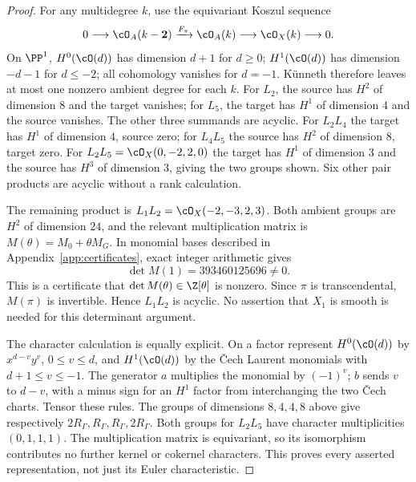 \begin{proof}
For any multidegree $k$, use the equivariant Koszul sequence
\[
 0\longrightarrow\cO_A(k-\mathbf2)
 \xrightarrow{F_\pi}\cO_A(k)\longrightarrow\cO_X(k)\longrightarrow0.
\]
On $\PP^1$, $H^0(\cO(d))$ has dimension $d+1$ for $d\ge0$;
$H^1(\cO(d))$ has dimension $-d-1$ for $d\le-2$; all cohomology
vanishes for $d=-1$. K\"unneth therefore leaves at most one nonzero
ambient degree for each $k$.
For $L_2$, the source has $H^2$ of dimension $8$ and the target
vanishes; for $L_5$, the target has $H^1$ of dimension $4$ and the
source vanishes. The other three summands are acyclic.
For $L_2L_4$ the target has $H^1$ of dimension $4$, source zero;
for $L_4L_5$ the source has $H^2$ of dimension $8$, target zero.
For $L_2L_5=\cO_X(0,-2,2,0)$ the target has $H^1$ of dimension $3$
and the source has $H^3$ of dimension $3$, giving the two groups shown.
Six other pair products are acyclic without a rank calculation.

The remaining product is $L_1L_2=\cO_X(-2,-3,2,3)$. Both ambient
groups are $H^2$ of dimension $24$, and the relevant multiplication
matrix is $M(\theta)=M_0+\theta M_G$. In monomial bases described in
Appendix~\ref{app:certificates}, exact integer arithmetic gives
\begin{equation}\label{eq:detcertificate}
 \det M(1)=393460125696\ne0.
\end{equation}
This is a certificate that $\det M(\theta)\in\Z[\theta]$ is nonzero.
Since $\pi$ is transcendental, $M(\pi)$ is invertible. Hence $L_1L_2$
is acyclic. No assertion that $X_1$ is smooth is needed for this
determinant argument.

The character calculation is equally explicit. On a factor represent
$H^0(\cO(d))$ by $x^{d-v}y^v$, $0\le v\le d$, and
$H^1(\cO(d))$ by the \v Cech Laurent monomials with
$d+1\le v\le-1$. The generator $a$ multiplies the monomial by $(-1)^v$;
$b$ sends $v$ to $d-v$, with a minus sign for an $H^1$ factor from
interchanging the two \v Cech charts. Tensor these rules.
The groups of dimensions $8,4,4,8$ above give respectively
$2R_\Gamma,R_\Gamma,R_\Gamma,2R_\Gamma$.
Both groups for $L_2L_5$ have character multiplicities $(0,1,1,1)$.
The multiplication matrix is equivariant, so its isomorphism contributes
no further kernel or cokernel characters. This proves every asserted
representation, not just its Euler characteristic.
\end{proof}

